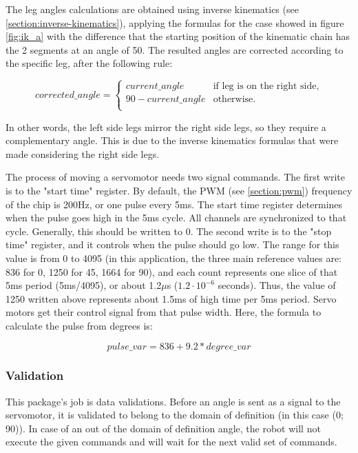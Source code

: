 \documentclass[runningheads,a4paper,12pt]{report}
\begin{document}
The leg angles calculations are obtained using inverse kinematics (see \ref{section:inverse-kinematics}), applying the formulas for the case showed in figure \ref{fig:ik_a} with the difference that the starting position of the kinematic chain has the 2 segments at an angle of 50\textdegree. The resulted angles are corrected according to the specific leg, after the following rule:

\begin{equation*}
    corrected\_angle = \begin{cases}
               current\_angle  & \text{if leg is on the right side,}\\
               90 - current\_angle  & \text{otherwise.}\\
               \end{cases}
\end{equation*}

In other words, the left side legs mirror the right side legs, so they require a complementary angle. This is due to the inverse kinematics formulas that were made considering the right side legs. 

The process of moving a servomotor needs two signal commands. The first write is to the "start time" register. By default, the PWM (see \ref{section:pwm}) frequency of the chip is 200Hz, or one pulse every 5ms. The start time register determines when the pulse goes high in the 5ms cycle. All channels are synchronized to that cycle. Generally, this should be written to 0. The second write is to the "stop time" register, and it controls when the pulse should go low. The range for this value is from 0 to 4095 (in this application, the three main reference values are: 836 for 0\textdegree, 1250 for 45\textdegree, 1664 for 90\textdegree), and each count represents one slice of that 5ms period (5ms/4095), or about 1.2$\mu$s ($1.2 \cdot 10^{-6}$ seconds). Thus, the value of 1250 written above represents about 1.5ms of high time per 5ms period. Servo motors get their control signal from that pulse width. Here, the formula to calculate the pulse from degrees is: 

\[pulse\_var = 836 + 9.2 * degree\_var\]

\subsubsection{Validation}
This package's job is data validations. Before an angle is sent as a signal to the servomotor, it is validated to belong to the domain of definition (in this case (0\textdegree; 90\textdegree)). In case of an out of the domain of definition angle, the robot will not execute the given commands and will wait for the next valid set of commands.
\end{document}
